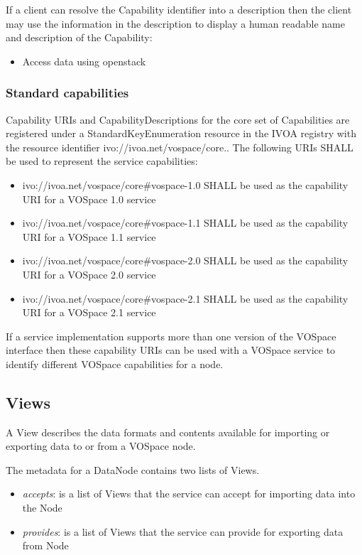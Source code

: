 \documentclass[11pt,a4paper]{ivoa}
\begin{document}
If a client can resolve the Capability identifier into a description then the client may use the information in the description to display a human readable name and description of the Capability:

\begin{itemize}
    \item Access data using openstack
\end{itemize}

\subsubsection{Standard capabilities}
\label{subsubsec:standard capabilities}
Capability URIs and CapabilityDescriptions for the core set of Capabilities are registered under a StandardKeyEnumeration resource \citep{std:STDREGEXT} in the IVOA registry with the resource identifier ivo://ivoa.net/vospace/core.. The following URIs SHALL be used to represent the service capabilities:

\begin{itemize}
    \item ivo://ivoa.net/vospace/core\#vospace-1.0 SHALL be used as the capability URI for a VOSpace 1.0 service
    \item ivo://ivoa.net/vospace/core\#vospace-1.1 SHALL be used as the capability URI for a VOSpace 1.1 service
    \item ivo://ivoa.net/vospace/core\#vospace-2.0 SHALL be used as the capability URI for a VOSpace 2.0 service
    \item ivo://ivoa.net/vospace/core\#vospace-2.1 SHALL be used as the capability URI for a VOSpace 2.1 service
\end{itemize}
If a service implementation supports more than one version of the VOSpace interface then these capability URIs can be used with a VOSpace service to identify different VOSpace capabilities for a node.

\subsection{Views}
\label{subsec:views}
A View describes the data formats and contents available for importing or exporting data to or from a VOSpace node.

The metadata for a DataNode contains two lists of Views.

\begin{itemize}
    \item \emph{accepts}: is a list of Views that the service can accept for importing data into the Node
    \item \emph{provides}: is a list of Views that the service can provide for exporting data from Node
\end{itemize}
\end{document}
